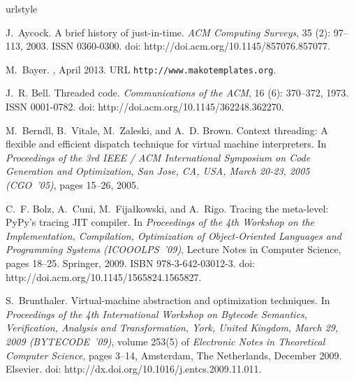 \documentclass[preprint,10pt]{popl14conf}
\begin{document}
\begin{thebibliography}{46}
\providecommand{\natexlab}[1]{#1}
\providecommand{\url}[1]{\texttt{#1}}
\expandafter\ifx\csname urlstyle\endcsname\relax
  \providecommand{\doi}[1]{doi: #1}\else
  \providecommand{\doi}{doi: \begingroup \urlstyle{rm}\Url}\fi

J.~Aycock.
\newblock A brief history of just-in-time.
\newblock \emph{ACM Computing Surveys}, 35 (2): 97--113,
  2003.
\newblock ISSN 0360-0300.
\newblock \doi{http://doi.acm.org/10.1145/857076.857077}.

M.~Bayer.
, April 2013.
\newblock URL \url{http://www.makotemplates.org}.

J.~R. Bell.
\newblock Threaded code.
\newblock \emph{Communications of the {ACM}}, 16 (6):
  370--372, 1973.
\newblock ISSN 0001-0782.
\newblock \doi{http://doi.acm.org/10.1145/362248.362270}.

M.~Berndl, B.~Vitale, M.~Zaleski, and A.~D. Brown.
\newblock Context threading: A flexible and efficient dispatch technique for
  virtual machine interpreters.
\newblock In \emph{Proceedings of the 3rd {IEEE / ACM International Symposium
  on Code Generation and Optimization}, San Jose, CA, USA, March 20-23, 2005
  (CGO~'05)}, pages 15--26, 2005.

C.~F. Bolz, A.~Cuni, M.~Fija{\l}kowski, and A.~Rigo.
\newblock Tracing the meta-level: {PyPy}'s tracing {JIT} compiler.
\newblock In \emph{Proceedings of the 4th Workshop on the Implementation,
  Compilation, Optimization of Object-Oriented Languages and Programming
  Systems (ICOOOLPS~'09)}, Lecture Notes in Computer Science, pages 18--25.
  Springer, 2009.
\newblock ISBN 978-3-642-03012-3.
\newblock \doi{http://doi.acm.org/10.1145/1565824.1565827}.

S.~Brunthaler.
\newblock Virtual-machine abstraction and optimization techniques.
\newblock In \emph{Proceedings of the 4th International Workshop on Bytecode
  Semantics, Verification, Analysis and Transformation, York, United Kingdom,
  March 29, 2009 (BYTECODE~'09)}, volume 253(5) of \emph{Electronic Notes in
  Theoretical Computer Science}, pages 3--14, Amsterdam, The Netherlands,
  December 2009. Elsevier.
\newblock \doi{http://dx.doi.org/10.1016/j.entcs.2009.11.011}.


\end{thebibliography}
\end{document}
